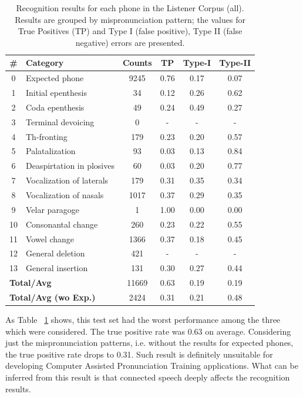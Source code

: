 \documentclass[twocolumn]{bmcart}%
\begin{document}
\small
\setlength{\tabcolsep}{0.3em}
\begin{table}[ht!]
\caption{Recognition results for each phone in the Listener Corpus (all). Results are grouped by mispronunciation pattern; the values for True Positives (TP) and Type I (false positive), Type II (false negative) errors are presented.}
\begin{tabular}{clcccc} \hline
\textbf{\#} & \textbf{Category} & \textbf{Counts} & \textbf{TP} & \textbf{Type-I} & \textbf{Type-II} \\ \hline
0 & Expected phone & 9245 & 0.76 & 0.17 & 0.07 \\
1 & Initial epenthesis & 34 & 0.12 & 0.26 & 0.62 \\
2 & Coda epenthesis & 49 & 0.24 & 0.49 & 0.27 \\
3 & Terminal devoicing & 0 & - & - & - \\
4 & Th-fronting & 179 & 0.23 & 0.20 & 0.57 \\
5 & Palatalization & 93 & 0.03 & 0.13 & 0.84 \\
6 & Deaspirtation in plosives & 60 & 0.03 & 0.20 & 0.77 \\
7 & Vocalization of laterals & 179 & 0.31 & 0.35 & 0.34 \\
8 & Vocalization of nasals & 1017 & 0.37 & 0.29 & 0.35 \\
9 & Velar paragoge & 1 & 1.00 & 0.00 & 0.00 \\
10 & Consonantal change & 260 & 0.23 & 0.22 & 0.55 \\
11 & Vowel change & 1366 & 0.37 & 0.18 & 0.45 \\
12 & General deletion & 421 & - & - & - \\
13 & General insertion & 131 & 0.30 & 0.27 & 0.44 \\ \hline 
\multicolumn{2}{l}{\textbf{Total/Avg}} & 11669 & 0.63 & 0.19 & 0.19 \\ 
\multicolumn{2}{l}{\textbf{Total/Avg (wo Exp.)}} & 2424 & 0.31 & 0.21 & 0.48 \\ \hline
\end{tabular}
\label{rec-listener-all}
\end{table}
\normalsize

As Table ~\ref{rec-listener-all} shows, this test set had the worst performance among the three which were considered. The true positive rate was 0.63 on average. Considering just the mispronunciation patterns, i.e. without the results for expected phones, the true positive rate drops to 0.31. Such result is definitely unsuitable for developing Computer Assisted Pronunciation Training applications. What can be inferred from this result is that connected speech deeply affects the recognition results.
\end{document}

